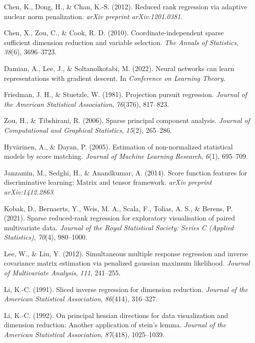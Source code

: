 \documentclass{article}
\begin{document}
\begin{thebibliography}{99}
 Chen, K., Dong, H., \& Chan, K.-S. (2012). Reduced rank regression via adaptive nuclear norm penalization. \textit{arXiv preprint arXiv:1201.0381}.

 Chen, X., Zou, C., \& Cook, R. D. (2010). Coordinate-independent sparse sufficient dimension reduction and variable selection. \textit{The Annals of Statistics}, \textit{38}(6), 3696–3723.

 Damian, A., Lee, J., \& Soltanolkotabi, M. (2022). Neural networks can learn representations with gradient descent. In \textit{Conference on Learning Theory}.

 Friedman, J. H., \& Stuetzle, W. (1981). Projection pursuit regression. \textit{Journal of the American Statistical Association}, \textit{76}(376), 817–823.

 Zou, H., \& Tibshirani, R. (2006). Sparse principal component analysis. \textit{Journal of Computational and Graphical Statistics}, \textit{15}(2), 265–286.

 Hyvärinen, A., \& Dayan, P. (2005). Estimation of non-normalized statistical models by score matching. \textit{Journal of Machine Learning Research}, \textit{6}(1), 695–709.

 Janzamin, M., Sedghi, H., \& Anandkumar, A. (2014). Score function features for discriminative learning: Matrix and tensor framework. \textit{arXiv preprint arXiv:1412.2863}.

 Kobak, D., Bernaerts, Y., Weis, M. A., Scala, F., Tolias, A. S., \& Berens, P. (2021). Sparse reduced-rank regression for exploratory visualisation of paired multivariate data. \textit{Journal of the Royal Statistical Society: Series C (Applied Statistics)}, \textit{70}(4), 980–1000.

 Lee, W., \& Liu, Y. (2012). Simultaneous multiple response regression and inverse covariance matrix estimation via penalized gaussian maximum likelihood. \textit{Journal of Multivariate Analysis}, \textit{111}, 241–255.

 Li, K.-C. (1991). Sliced inverse regression for dimension reduction. \textit{Journal of the American Statistical Association}, \textit{86}(414), 316–327.

 Li, K.-C. (1992). On principal hessian directions for data visualization and dimension reduction: Another application of stein's lemma. \textit{Journal of the American Statistical Association}, \textit{87}(418), 1025–1039.


\end{thebibliography}
\end{document}
